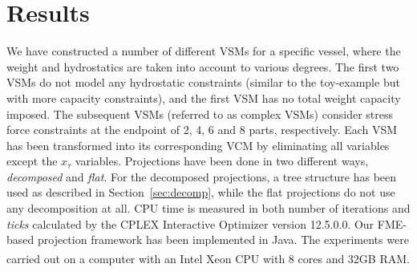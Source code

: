 \documentclass{llncs}
\begin{document}
\section{Results}\label{sec:results}
We have constructed a number of different VSMs for a specific vessel, where the weight and hydrostatics are taken into account to various degrees. The first two VSMs do not model any hydrostatic constraints (similar to the toy-example but with more capacity constraints), and the first VSM has no total weight capacity imposed. The subsequent VSMs (referred to as complex VSMs) consider stress force constraints at the endpoint of 2, 4, 6 and 8 parts, respectively. 
Each VSM has been transformed into its corresponding VCM by eliminating all variables except the $x_\tau$ variables. Projections have been done in two different ways, \emph{decomposed} and \emph{flat}. For the decomposed projections, a tree structure has been used as described in Section~\ref{sec:decomp}, while the flat projections do not use any decomposition at all. CPU time is measured in both number of iterations and \emph{ticks} calculated by the CPLEX Interactive Optimizer version 12.5.0.0. Our FME-based projection framework has been implemented in Java. The experiments were carried out on a computer with an {Intel\textsuperscript{\textregistered} Xeon\textsuperscript{\textregistered} CPU with 8 cores and 32GB RAM.}
\end{document}
